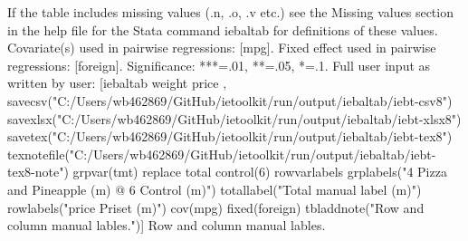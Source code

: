 If the table includes missing values (.n, .o, .v etc.) see the Missing values section in the help file for the Stata command iebaltab for definitions of these values. Covariate(s) used in pairwise regressions: [mpg]. Fixed effect used in pairwise regressions: [foreign]. Significance: ***=.01, **=.05, *=.1. Full user input as written by user: [iebaltab weight price , savecsv("C:/Users/wb462869/GitHub/ietoolkit/run/output/iebaltab/iebt-csv8") savexlsx("C:/Users/wb462869/GitHub/ietoolkit/run/output/iebaltab/iebt-xlsx8") savetex("C:/Users/wb462869/GitHub/ietoolkit/run/output/iebaltab/iebt-tex8") texnotefile("C:/Users/wb462869/GitHub/ietoolkit/run/output/iebaltab/iebt-tex8-note") grpvar(tmt) replace total control(6) rowvarlabels grplabels("4 Pizza and Pineapple (m) @ 6 Control (m)") totallabel("Total manual label (m)") rowlabels("price Priset (m)") cov(mpg) fixed(foreign) tbladdnote("Row and column manual lables.")] Row and column manual lables.
